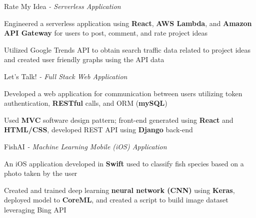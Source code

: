 \begin{siderulesProj}
\par\addvspace{-1.2ex}
\begin{cventriesproject}
  \cventryproject
  {Rate My Idea  \hspace{0.15em}\bodyfontlight\itshape{- Serverless Application}}
  {
    \begin{cvskillitems}
      \item {Engineered a serverless application using \textbf{React}, \textbf{AWS Lambda}, and \textbf{Amazon API Gateway} for users to post, comment, and rate project ideas }
      \item {Utilized Google Trends API to obtain search traffic data related to project ideas and created user friendly graphs using the API data}
    \end{cvskillitems}
  }
  \cventryproject
    {Let's Talk!  \hspace{0.15em}\bodyfontlight\itshape{- Full Stack Web Application}}
    {
      \begin{cvskillitems}
        \item {Developed a web application for communication between users utilizing token authentication, \textbf{RESTful} calls, and ORM (\textbf{mySQL})}
        \item {Used \textbf{MVC} software design pattern; front-end generated using \textbf{React} and \textbf{HTML/CSS}, developed REST API using \textbf{Django} back-end}
      \end{cvskillitems}
    }
  \cventryproject
    {FishAI  \hspace{0.15em}\bodyfontlight\itshape{- Machine Learning Mobile (iOS) Application}}
    {
      \begin{cvskillitems}
        \item {An iOS application developed in \textbf{Swift} used to classify fish species based on a photo taken by the user}
        \item {Created and trained deep learning \textbf{neural network (CNN)} using \textbf{Keras}, deployed model to \textbf{CoreML}, and created a script to build image dataset leveraging Bing API}
      \end{cvskillitems}
    }
\end{cventriesproject}
\end{siderulesProj}

